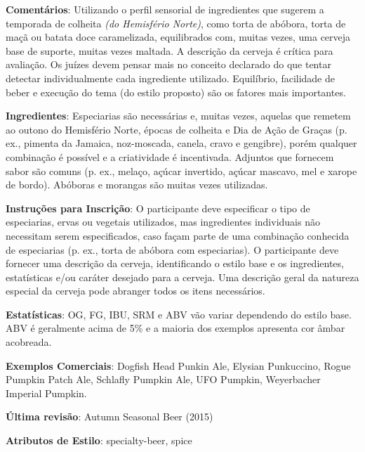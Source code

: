 \textbf{Comentários}: Utilizando o perfil sensorial de ingredientes que sugerem a temporada de colheita \textit{(do Hemisfério Norte)}, como torta de abóbora, torta de maçã ou batata doce caramelizada, equilibrados com, muitas vezes, uma cerveja base de suporte, muitas vezes maltada. A descrição da cerveja é crítica para avaliação. Os juízes devem pensar mais no conceito declarado do que tentar detectar individualmente cada ingrediente utilizado. Equilíbrio, facilidade de beber e execução do tema (do estilo proposto) são os fatores mais importantes.

\textbf{Ingredientes}: Especiarias são necessárias e, muitas vezes, aquelas que remetem ao outono do Hemisfério Norte, épocas de colheita e Dia de Ação de Graças (p. ex., pimenta da Jamaica, noz-moscada, canela, cravo e gengibre), porém qualquer combinação é possível e a criatividade é incentivada. Adjuntos que fornecem sabor são comuns (p. ex., melaço, açúcar invertido, açúcar mascavo, mel e xarope de bordo). Abóboras e morangas são muitas vezes utilizadas.

\textbf{Instruções para Inscrição}: O participante deve especificar o tipo de especiarias, ervas ou vegetais utilizados, mas ingredientes individuais não necessitam serem especificados, caso façam parte de uma combinação conhecida de especiarias (p. ex., torta de abóbora com especiarias). O participante deve fornecer uma descrição da cerveja, identificando o estilo base e os ingredientes, estatísticas e/ou caráter desejado para a cerveja. Uma descrição geral da natureza especial da cerveja pode abranger todos os itens necessários.

\textbf{Estatísticas}: OG, FG, IBU, SRM e ABV vão variar dependendo do estilo base. ABV é geralmente acima de 5\% e a maioria dos exemplos apresenta cor âmbar acobreada.

\textbf{Exemplos Comerciais}: Dogfish Head Punkin Ale, Elysian Punkuccino, Rogue Pumpkin Patch Ale, Schlafly Pumpkin Ale, UFO Pumpkin, Weyerbacher Imperial Pumpkin.

\textbf{Última revisão}: Autumn Seasonal Beer (2015)

\textbf{Atributos de Estilo}: specialty-beer, spice
